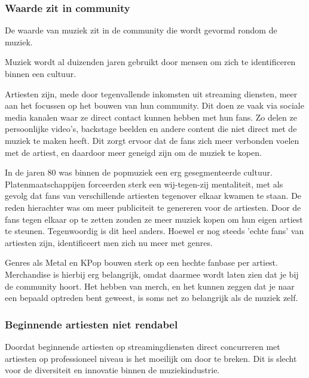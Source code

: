 \subsubsection*{Waarde zit in community}
\begin{quotebox}
De waarde van muziek zit in de community die wordt gevormd rondom de muziek.
\end{quotebox}

Muziek wordt al duizenden jaren gebruikt door mensen om zich te identificeren binnen een cultuur.

Artiesten zijn, mede door tegenvallende inkomsten uit streaming diensten, meer aan het focussen op het bouwen van hun community. Dit doen ze vaak via sociale media kanalen waar ze direct contact kunnen hebben met hun fans. Zo delen ze persoonlijke video's, backstage beelden en andere content die niet direct met de muziek te maken heeft. Dit zorgt ervoor dat de fans zich meer verbonden voelen met de artiest, en daardoor meer geneigd zijn om de muziek te kopen.

In de jaren 80 was binnen de popmuziek een erg gesegmenteerde cultuur. Platenmaatschappijen forceerden sterk een wij-tegen-zij mentaliteit, met als gevolg dat fans van verschillende artiesten tegenover elkaar kwamen te staan. De reden hierachter was om meer publiciteit te genereren voor de artiesten. Door de fans tegen elkaar op te zetten zouden ze meer muziek kopen om hun eigen artiest te steunen. Tegenwoordig is dit heel anders. Hoewel er nog steeds 'echte fans' van artiesten zijn, identificeert men zich nu meer  met genres.

Genres als Metal en KPop bouwen sterk op een hechte fanbase per artiest. Merchandise is hierbij erg belangrijk, omdat daarmee wordt laten zien dat je bij de community hoort. Het hebben van merch, en het kunnen zeggen dat je naar een bepaald optreden bent geweest, is soms net zo belangrijk als de muziek zelf.

\subsubsection*{Beginnende artiesten niet rendabel}
\begin{quotebox}
Doordat beginnende artiesten op streamingdiensten direct concurreren met artiesten op professioneel niveau is het moeilijk om door te breken. Dit is slecht voor de diversiteit en innovatie binnen de muziekindustrie.
\end{quotebox}

